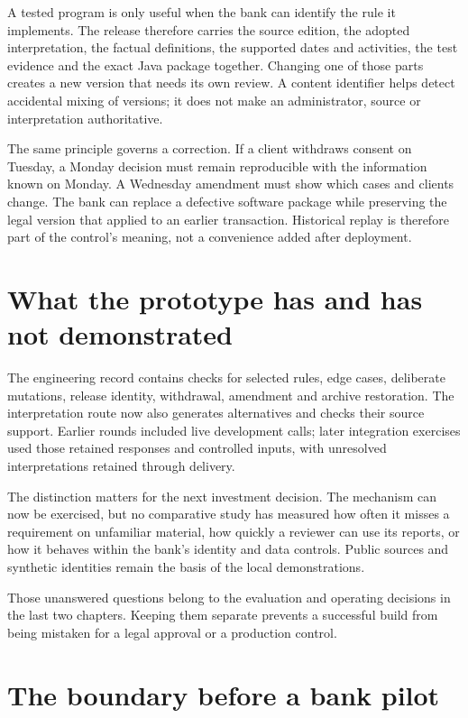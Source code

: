 \documentclass[12pt,a4paper,oneside,openany]{book}
\begin{document}
A tested program is only useful when the bank can identify the rule it implements.
The release therefore carries the source edition, the adopted interpretation,
the factual definitions, the supported dates and activities, the test evidence
and the exact Java package together. Changing one of those parts creates a new
version that needs its own review. A content identifier helps detect accidental
mixing of versions; it does not make an administrator, source or interpretation
authoritative.

The same principle governs a correction. If a client withdraws consent on
Tuesday, a Monday decision must remain reproducible with the information known
on Monday. A Wednesday amendment must show which cases and clients change. The
bank can replace a defective software package while preserving the legal version
that applied to an earlier transaction. Historical replay is therefore part of
the control's meaning, not a convenience added after deployment.

\section{What the prototype has and has not demonstrated}

The engineering record contains checks for selected rules, edge cases,
deliberate mutations, release identity, withdrawal, amendment and archive
restoration. The interpretation route now also generates alternatives and
checks their source support. Earlier rounds included live development calls;
later integration exercises used those retained responses and controlled
inputs, with unresolved interpretations retained through delivery.

The distinction matters for the next investment decision. The mechanism can now
be exercised, but no comparative study has measured how often it misses a
requirement on unfamiliar material, how quickly a reviewer can use its reports,
or how it behaves within the bank's identity and data controls. Public sources
and synthetic identities remain the basis of the local demonstrations.

Those unanswered questions belong to the evaluation and operating decisions in
the last two chapters. Keeping them separate prevents a successful build from
being mistaken for a legal approval or a production control.

\section{The boundary before a bank pilot}
\end{document}
